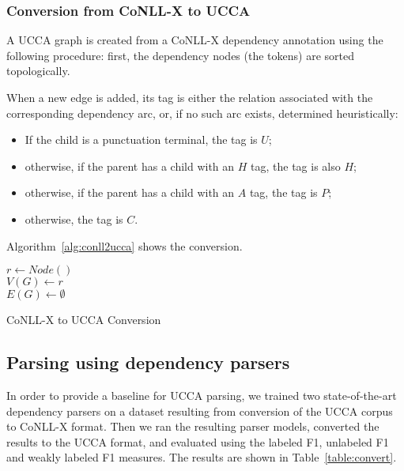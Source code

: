 \documentclass[11pt]{article}
\begin{document}
\subsubsection{Conversion from CoNLL-X to UCCA}

A UCCA graph is created from a CoNLL-X dependency annotation using the following procedure: first, the dependency nodes (the tokens) are sorted topologically.

When a new edge is added, its tag is either the relation associated with the corresponding dependency arc, or, if no such arc exists, determined heuristically:
\begin{itemize}
\item If the child is a punctuation terminal, the tag is $U$;
\item otherwise, if the parent has a child with an $H$ tag, the tag is also $H$;
\item otherwise, if the parent has a child with an $A$ tag, the tag is $P$;
\item otherwise, the tag is $C$.
\end{itemize}

Algorithm~\ref{alg:conll2ucca} shows the conversion.

\begin{algorithm}
 $r \leftarrow Node()$\\
 $V(G) \leftarrow r$\\
 $E(G) \leftarrow \emptyset$\\
 \caption{CoNLL-X to UCCA Conversion}
 \label{alg:conll2ucca}
\end{algorithm}

\subsection{Parsing using dependency parsers}

In order to provide a baseline for UCCA parsing, we trained two state-of-the-art dependency parsers on a dataset resulting from conversion of the UCCA corpus to CoNLL-X format. Then we ran the resulting parser models, converted the results to the UCCA format, and evaluated using the labeled F1, unlabeled F1 and weakly labeled F1 measures. The results are shown in Table~\ref{table:convert}.
\end{document}
